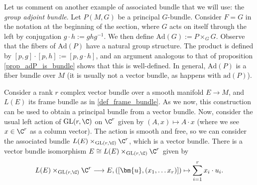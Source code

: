 
\begin{example} \label{ex_group_adjoint_bundle}
    Let us comment on another example of associated bundle that we will use: the \textit{group adjoint bundle}. Let \(P(M,G)\) be a principal \(G\)-bundle. Consider \(F=G\) in the notation at the beginning of the section, where \(G\) acts on itself through the left by conjugation \(g \cdot h :=ghg^{-1}\). We then define \(\mathrm{Ad}(G):=P \times_G G\). Observe that the fibers of \(\mathrm{Ad}(P)\) have a natural group structure. The product is defined by \([p, g] \cdot [p, h]:=[p, g\cdot h]\), and an argument analogous to that of proposition \ref{prop_adP_is_bundle} shows that this is well-defined. In general, \(\mathrm{Ad}(P)\) is a fiber bundle over \(M\) (it is usually not a vector bundle, as happens with \(\mathrm{ad}(P)\)).
\end{example}

\begin{example} \label{ex_associated_bundle_to_frame_bundle}
    Consider a rank \(r\) complex vector bundle over a smooth manifold \(E \to M\), and \(L(E)\) its frame bundle as in \eqref{def_frame_bundle}. As we now, this construction can be used to obtain a principal bundle from a vector bundle. Now, consider the usual left action of \(\mathrm{GL}(r, \C)\) on \(\C^r\) given by \((A, x) \mapsto A\cdot x\) (where we see \(x \in \C^r\) as a column vector). The action is smooth and free, so we can consider the associated bundle \(L(E) \times_{\mathrm{GL}(r, \C)} \C^r\), which is a vector bundle. There is a vector bundle isomorphism \(E \cong L(E) \times_{\mathrm{GL}(r,\C)}\C^r\) given by 
    \[
    L(E) \times_{\mathrm{GL}(r, \C)} \C^r \longrightarrow E, ([\bm{u}, (x_1, \ldots x_r)]) \mapsto \sum_{i=1}^r x_i\cdot u_i.
    \]
\end{example}

